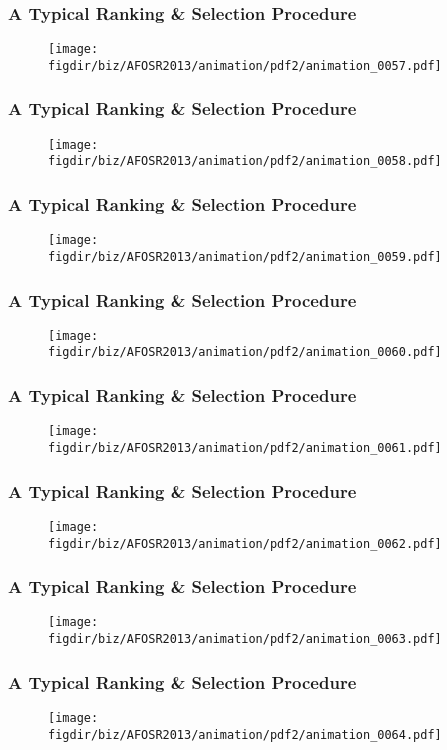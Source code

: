 \documentclass[13pt]{beamer}
\newcommand{\figdir}{../../fig}
\begin{document}
{\begin{frame}\frametitle{A Typical Ranking \& Selection Procedure}\begin{figure}\texttt{[image: \\figdir/biz/AFOSR2013/animation/pdf2/animation\_0057.pdf]}\end{figure}\end{frame}
\begin{frame}\frametitle{A Typical Ranking \& Selection Procedure}\begin{figure}\texttt{[image: \\figdir/biz/AFOSR2013/animation/pdf2/animation\_0058.pdf]}\end{figure}\end{frame}
\begin{frame}\frametitle{A Typical Ranking \& Selection Procedure}\begin{figure}\texttt{[image: \\figdir/biz/AFOSR2013/animation/pdf2/animation\_0059.pdf]}\end{figure}\end{frame}
\begin{frame}\frametitle{A Typical Ranking \& Selection Procedure}\begin{figure}\texttt{[image: \\figdir/biz/AFOSR2013/animation/pdf2/animation\_0060.pdf]}\end{figure}\end{frame}
\begin{frame}\frametitle{A Typical Ranking \& Selection Procedure}\begin{figure}\texttt{[image: \\figdir/biz/AFOSR2013/animation/pdf2/animation\_0061.pdf]}\end{figure}\end{frame}
\begin{frame}\frametitle{A Typical Ranking \& Selection Procedure}\begin{figure}\texttt{[image: \\figdir/biz/AFOSR2013/animation/pdf2/animation\_0062.pdf]}\end{figure}\end{frame}
\begin{frame}\frametitle{A Typical Ranking \& Selection Procedure}\begin{figure}\texttt{[image: \\figdir/biz/AFOSR2013/animation/pdf2/animation\_0063.pdf]}\end{figure}\end{frame}
\begin{frame}\frametitle{A Typical Ranking \& Selection Procedure}\begin{figure}\texttt{[image: \\figdir/biz/AFOSR2013/animation/pdf2/animation\_0064.pdf]}\end{figure}\end{frame}
}
\end{document}
